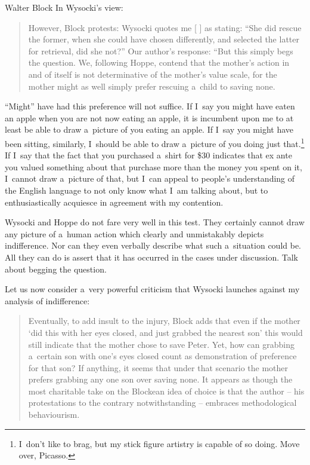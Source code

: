 \begin{artengenv}{Walter Block}
In Wysocki's view:



\begin{quote}
However, Block 
\parencite*[][pp.50–51]{block_response_2022} %
 protests: Wysocki quotes me [
\parencite[][pp.50–51]{block_response_2022}%
] as stating: ``She did rescue the former, when she could have chosen differently, and selected the latter for retrieval, did she not?'' Our author's response: ``But this simply begs the question. We, following Hoppe, contend that the mother's action in and of itself is not determinative of the mother's value scale, for the mother might as well simply prefer rescuing a~child to saving none.
\end{quote}


``Might'' have had this preference will not suffice. If I~say you might have eaten an apple when you are not now eating an apple, it is incumbent upon me to at least be able to draw a~picture of you eating an apple. If I~say you might have been sitting, similarly, I~should be able to draw a~picture of you doing just that.\footnote{I~don't like to brag, but my stick figure artistry is capable of so doing. Move over, Picasso.} If I~say that the fact that you purchased a~shirt for \$30 indicates that ex ante you valued something about that purchase more than the money you spent on it, I~cannot draw a~picture of that, but I~can appeal to people's understanding of the English language to not only know what I~am talking about, but to enthusiastically acquiesce in agreement with my contention.



Wysocki and Hoppe do not fare very well in this test. They certainly cannot draw any picture of a~human action which clearly and unmistakably depicts indifference. Nor can they even verbally describe what such a~situation could be. All they can do is assert that it has occurred in the cases under discussion. Talk about begging the question.



Let us now consider a~very powerful criticism that Wysocki launches against my analysis of indifference:



\begin{quote}
Eventually, to add insult to the injury, Block 
\parencite*[][p.51]{block_response_2022} %
 adds that even if the mother ‘did this with her eyes closed, and just grabbed the nearest son' this would still indicate that the mother chose to save Peter. Yet, how can grabbing a~certain son with one's eyes closed count as demonstration of preference for that son? If anything, it seems that under that scenario the mother prefers grabbing any one son over saving none. It appears as though the most charitable take on the Blockean idea of choice is that the author -- his protestations to the contrary notwithstanding -- embraces methodological behaviourism.
\end{quote}




\end{artengenv}

